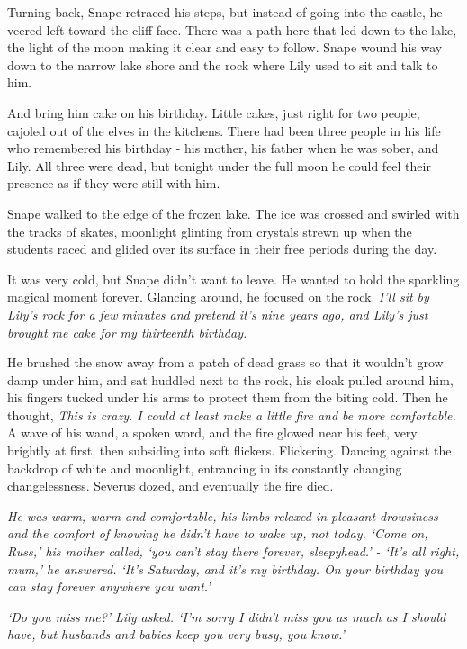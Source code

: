 \documentclass[a4paper,11pt]{article}
\begin{document}
Turning back, Snape retraced his steps, but instead of going into the castle, he veered left toward the cliff face. There was a path here that led down to the lake, the light of the moon making it clear and easy to follow. Snape wound his way down to the narrow lake shore and the rock where Lily used to sit and talk to him.

And bring him cake on his birthday. Little cakes, just right for two people, cajoled out of the elves in the kitchens. There had been three people in his life who remembered his birthday - his mother, his father when he was sober, and Lily. All three were dead, but tonight under the full moon he could feel their presence as if they were still with him.

Snape walked to the edge of the frozen lake. The ice was crossed and swirled with the tracks of skates, moonlight glinting from crystals strewn up when the students raced and glided over its surface in their free periods during the day.

It was very cold, but Snape didn't want to leave. He wanted to hold the sparkling magical moment forever. Glancing around, he focused on the rock. \emph{I'll sit by Lily's rock for a few minutes and pretend it's nine years ago, and Lily's just brought me cake for my thirteenth birthday.}

He brushed the snow away from a patch of dead grass so that it wouldn't grow damp under him, and sat huddled next to the rock, his cloak pulled around him, his fingers tucked under his arms to protect them from the biting cold. Then he thought, \emph{This is crazy. I could at least make a little fire and be more comfortable.} A wave of his wand, a spoken word, and the fire glowed near his feet, very brightly at first, then subsiding into soft flickers. Flickering. Dancing against the backdrop of white and moonlight, entrancing in its constantly changing changelessness. Severus dozed, and eventually the fire died.

\emph{He was warm, warm and comfortable, his limbs relaxed in pleasant drowsiness and the comfort of knowing he didn't have to wake up, not today. `Come on, Russ,' his mother called, `you can't stay there forever, sleepyhead.' - `It's all right, mum,' he answered. `It's Saturday, and it's my birthday. On your birthday you can stay forever anywhere you want.'}

\emph{`Do you miss me?' Lily asked. `I'm sorry I didn't miss you as much as I should have, but husbands and babies keep you very busy, you know.'}
\end{document}
